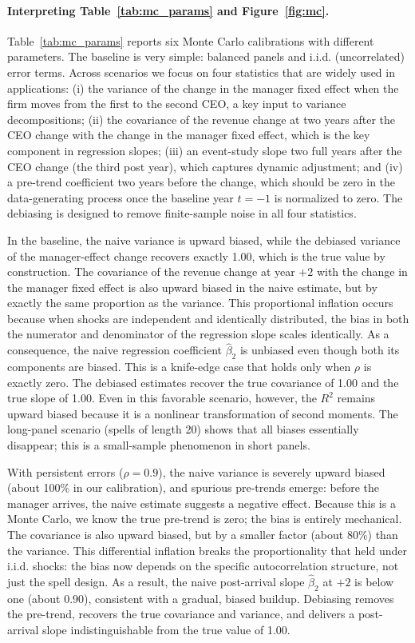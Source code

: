 \documentclass[11pt,a4paper]{article}
\begin{document}
\paragraph{Interpreting Table~\ref{tab:mc_params} and Figure~\ref{fig:mc}.}
Table~\ref{tab:mc_params} reports six Monte Carlo calibrations with different parameters. The baseline is very simple: balanced panels and i.i.d. (uncorrelated) error terms. Across scenarios we focus on four statistics that are widely used in applications: (i) the variance of the change in the manager fixed effect when the firm moves from the first to the second CEO, a key input to variance decompositions; (ii) the covariance of the revenue change at two years after the CEO change with the change in the manager fixed effect, which is the key component in regression slopes; (iii) an event-study slope two full years after the CEO change (the third post year), which captures dynamic adjustment; and (iv) a pre-trend coefficient two years before the change, which should be zero in the data-generating process once the baseline year $t=-1$ is normalized to zero. The debiasing is designed to remove finite-sample noise in all four statistics.

In the baseline, the naive variance is upward biased, while the debiased variance of the manager-effect change recovers exactly 1.00, which is the true value by construction. The covariance of the revenue change at year $+2$ with the change in the manager fixed effect is also upward biased in the naive estimate, but by exactly the same proportion as the variance. This proportional inflation occurs because when shocks are independent and identically distributed, the bias in both the numerator and denominator of the regression slope scales identically. As a consequence, the naive regression coefficient $\hat\beta_2$ is unbiased even though both its components are biased. This is a knife-edge case that holds only when $\rho$ is exactly zero. The debiased estimates recover the true covariance of 1.00 and the true slope of 1.00. Even in this favorable scenario, however, the $R^2$ remains upward biased because it is a nonlinear transformation of second moments. The long-panel scenario (spells of length 20) shows that all biases essentially disappear; this is a small-sample phenomenon in short panels.

With persistent errors ($\rho=0.9$), the naive variance is severely upward biased (about 100\% in our calibration), and spurious pre-trends emerge: before the manager arrives, the naive estimate suggests a negative effect. Because this is a Monte Carlo, we know the true pre-trend is zero; the bias is entirely mechanical. The covariance is also upward biased, but by a smaller factor (about 80\%) than the variance. This differential inflation breaks the proportionality that held under i.i.d. shocks: the bias now depends on the specific autocorrelation structure, not just the spell design. As a result, the naive post-arrival slope $\hat\beta_2$ at $+2$ is below one (about 0.90), consistent with a gradual, biased buildup. Debiasing removes the pre-trend, recovers the true covariance and variance, and delivers a post-arrival slope indistinguishable from the true value of 1.00.
\end{document}

